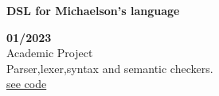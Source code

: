 \begin{minipage}{0.8\textwidth}
    \parbox{0.8\linewidth}{\textbf{DSL for Michaelson's language}} \hfill \textbf{01/2023}\\
    Academic Project\\
    Parser,lexer,syntax and semantic checkers.\\
    \href{https://github.com/geeksLabTech/compilation-dsl-project}{see code}\\
    \end{minipage} \hfill {}\\\\